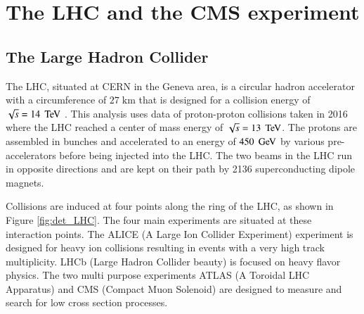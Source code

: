 
\chapter{The LHC and the CMS experiment}
\label{sec:det}

\section{The Large Hadron Collider}
\label{det:LHC}

The LHC, situated at CERN in the Geneva area, is a circular hadron accelerator with a circumference of $27 \; \mathrm{km}$ that is designed for a collision energy of $\sqrt{s} = 14 \; \,\text{Te\hspace{-.08em}V}$ \cite{1748-0221-3-08-S08001}.
This analysis uses data of proton-proton collisions taken in 2016 where the LHC reached a center of mass energy of $\sqrt{s}= 13 \; \,\text{Te\hspace{-.08em}V}$.
The protons are assembled in bunches and accelerated to an energy of  $450 \; \,\text{Ge\hspace{-.08em}V}$ by various pre-accelerators before being injected into the LHC.
The two beams in the LHC run in opposite directions and are kept on their path by 2136 superconducting dipole magnets.

Collisions are induced at four points along the ring of the LHC, as shown in Figure \ref{fig:det_LHC}. The four main experiments are situated at these interaction points.
The ALICE (A Large Ion Collider Experiment) experiment is designed for heavy ion collisions resulting in events with a very high track multiplicity.
LHCb (Large Hadron Collider beauty) is focused on heavy flavor physics.
The two multi purpose experiments ATLAS (A Toroidal LHC Apparatus) and CMS (Compact Muon Solenoid) are designed to measure and search for low cross section processes.

